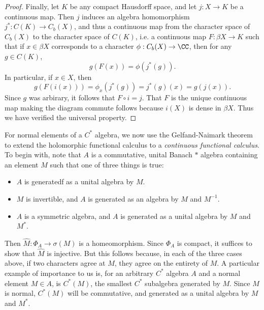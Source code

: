 \begin{proof}
    Finally, let $K$ be any compact Hausdorff space, and let $j: X \to K$ be a continuous map. Then $j$ induces an algebra homomorphism $j^*: C(K) \to C_b(X)$, and thus a continuous map from the character space of $C_b(X)$ to the character space of $C(K)$, i.e. a continuous map $F: \beta X \to K$ such that if $x \in \beta X$ corresponds to a character $\phi: C_b(X) \to \CC$, then for any $g \in C(K)$,
    \[ g(F(x)) = \phi(j^*(g)). \]
    In particular, if $x \in X$, then
    \[ g(F(i(x))) = \phi_x(j^*(g)) = j^*(g)(x) = g(j(x)). \]
    Since $g$ was arbirary, it follows that $F \circ i = j$. That $F$ is the unique continuous map making the diagram commute follows because $i(X)$ is dense in $\beta X$. Thus we have verified the universal property.
\end{proof}

For normal elements of a $C^*$ algebra, we now use the Gelfand-Naimark theorem to extend the holomorphic functional calculus to a \emph{continuous functional calculus}. To begin with, note that $A$ is a commutative, unital Banach $*$ algebra containing an element $M$ such that one of three things is true:
%
\begin{itemize}
    \item $A$ is generatedf as a unital algebra by $M$.
    \item $M$ is invertible, and $A$ is generated as an algebra by $M$ and $M^{-1}$.
    \item $A$ is a symmetric algebra, and $A$ is generated as a unital algebra by $M$ and $M^*$.
\end{itemize}
%
Then $\widehat{M}: \Phi_A \to \sigma(M)$ is a homeomorphism. Since $\Phi_A$ is compact, it suffices to show that $\widehat{M}$ is injective. But this follows because, in each of the three cases above, if two characters agree at $M$, they agree on the entirety of $M$. A particular example of importance to us is, for an arbitrary $C^*$ algebra $A$ and a normal element $M \in A$, is $C^*(M)$, the smallest $C^*$ subalgebra generated by $M$. Since $M$ is normal, $C^*(M)$ will be commutative, and generated as a unital algebra by $M$ and $M^*$.


